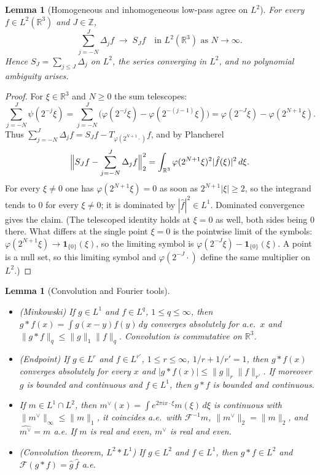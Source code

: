 \documentclass[11pt]{article}
\newtheorem{lemma}[theorem]{Lemma}
\theoremstyle{definition}
\theoremstyle{plain}
\newcommand{\R}{\mathbb R}
\newcommand{\norm}[1]{\lVert #1\rVert}
\begin{document}
\begin{lemma}[Homogeneous and inhomogeneous low-pass agree on $L^2$]
\label{lem:lp-coincide}
For every $f\in L^2(\R^3)$ and $J\in\mathbb Z$,
\[
 \sum_{j=-N}^{J}\Delta_jf\;\longrightarrow\;S_Jf
 \quad\text{in }L^2(\R^3)\text{ as }N\to\infty .
\]
Hence $S_J=\sum_{j\le J}\Delta_j$ on $L^2$, the series converging in $L^2$,
and no polynomial ambiguity arises.
\end{lemma}

\begin{proof}
For $\xi\in\R^3$ and $N\ge0$ the sum telescopes:
\[
 \sum_{j=-N}^{J}\psi(2^{-j}\xi)
 =\sum_{j=-N}^{J}\bigl(\varphi(2^{-j}\xi)-\varphi(2^{-(j-1)}\xi)\bigr)
 =\varphi(2^{-J}\xi)-\varphi(2^{N+1}\xi).
\]
Thus $\sum_{j=-N}^J\Delta_jf=S_Jf-T_{\varphi(2^{N+1}\cdot)}f$, and by
Plancherel
\[
 \Bigl\|S_Jf-\sum_{j=-N}^{J}\Delta_jf\Bigr\|_2^2
 =\int_{\R^3}\varphi(2^{N+1}\xi)^2|\hat f(\xi)|^2\,d\xi .
\]
For every $\xi\ne0$ one has $\varphi(2^{N+1}\xi)=0$ as soon as
$2^{N+1}|\xi|\ge2$, so the integrand tends to $0$ for every $\xi\ne0$; it is
dominated by $|\hat f|^2\in L^1$.  Dominated convergence gives the claim.
(The telescoped identity holds at $\xi=0$ as well, both sides being $0$
there.  What differs at the single point $\xi=0$ is the pointwise limit of
the symbols: $\varphi(2^{N+1}\xi)\to\mathbf 1_{\{0\}}(\xi)$, so the limiting
symbol is $\varphi(2^{-J}\xi)-\mathbf 1_{\{0\}}(\xi)$.  A point is a null
set, so this limiting symbol and $\varphi(2^{-J}\cdot)$ define the same
multiplier on $L^2$.)
\end{proof}

\begin{lemma}[Convolution and Fourier tools]\label{lem:fourier-tools}
\begin{itemize}
\item[(i)] (Minkowski) If $g\in L^1$ and $f\in L^q$, $1\le q\le\infty$, then
$g*f(x)=\int g(x-y)f(y)\,dy$ converges absolutely for a.e.\ $x$ and
$\norm{g*f}_q\le\norm g_1\norm f_q$.  Convolution is commutative on $\R^3$.
\item[(ii)] (Endpoint) If $g\in L^r$ and $f\in L^{r'}$, $1\le r\le\infty$,
$1/r+1/r'=1$, then $g*f(x)$ converges absolutely for \emph{every} $x$ and
$|g*f(x)|\le\norm g_r\norm f_{r'}$.  If moreover $g$ is bounded and
continuous and $f\in L^1$, then $g*f$ is bounded and continuous.
\item[(iii)] If $m\in L^1\cap L^2$, then $m^\vee(x)=\int e^{2\pi ix\cdot\xi}m(\xi)\,d\xi$
is continuous with $\norm{m^\vee}_\infty\le\norm m_1$, it coincides a.e.\ with
$\mathcal F^{-1}m$, $\norm{m^\vee}_2=\norm m_2$, and $\widehat{m^\vee}=m$ a.e.
If $m$ is real and even, $m^\vee$ is real and even.
\item[(iv)] (Convolution theorem, $L^2*L^1$) If $g\in L^2$ and $f\in L^1$,
then $g*f\in L^2$ and $\mathcal F(g*f)=\hat g\,\hat f$ a.e.
\end{itemize}
\end{lemma}
\end{document}
